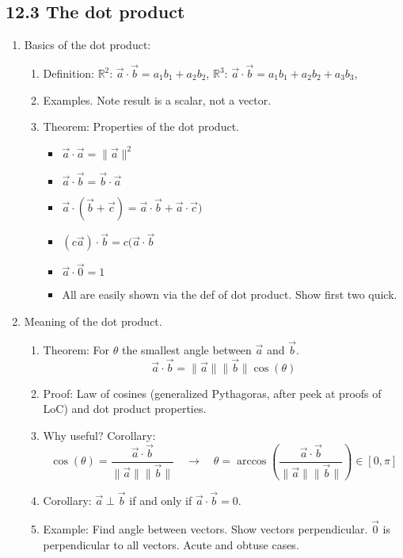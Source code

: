 \documentclass{article}
\begin{document}
\subsection{12.3 The dot product}
\begin{enumerate}
\item Basics of the dot product:
\begin{enumerate}
\item Definition: $\mathbb{R}^2$: $\vec{a} \cdot \vec{b} = a_1b_1 + a_2b_2$,  $\mathbb{R}^3$: $\vec{a} \cdot \vec{b} = a_1b_1 + a_2b_2 + a_3b_3$, 
\item Examples. Note result is a scalar, not a vector.
\item Theorem: Properties of the dot product.
\begin{itemize}
\item $\vec{a} \cdot \vec{a} = \|\vec{a}\|^2$
\item $\vec{a} \cdot \vec{b} = \vec{b} \cdot \vec{a}$
\item $\vec{a} \cdot (\vec{b} + \vec{c}) = \vec{a} \cdot \vec{b} +  \vec{a} \cdot \vec{c})$
\item $(c \vec{a}) \cdot \vec{b} = c(\vec{a} \cdot \vec{b}$
\item $\vec{a} \cdot \vec{0} = 1$
\item All are easily shown via the def of dot product. Show first two quick.
\end{itemize}
\end{enumerate}

\item Meaning of the dot product.
\begin{enumerate}
\item Theorem: For $\theta$ the smallest angle between $\vec{a}$ and $\vec{b}$.
\[
\vec{a} \cdot \vec{b} = \|\vec{a} \| \| \vec{b} \| \cos(\theta)
\]
\item Proof: Law of cosines (generalized Pythagoras, after peek at proofs of LoC) and dot product properties.
\item Why useful? Corollary:
\[
\cos(\theta) = \frac{\vec{a} \cdot \vec{b}}{\|\vec{a}\| \|\vec{b}\|} \quad \rightarrow \quad \theta = \arccos\left(\frac{\vec{a} \cdot \vec{b}}{\|\vec{a}\| \|\vec{b}\|}\right) \in [0,\pi]
\]
\item Corollary: $\vec{a} \perp \vec{b}$ if and only if $\vec{a} \cdot \vec{b}=0$.
\item Example: Find angle between vectors. Show vectors perpendicular. $\vec{0}$ is perpendicular to all vectors. Acute and obtuse cases.
\end{enumerate}


\end{enumerate}
\end{document}
